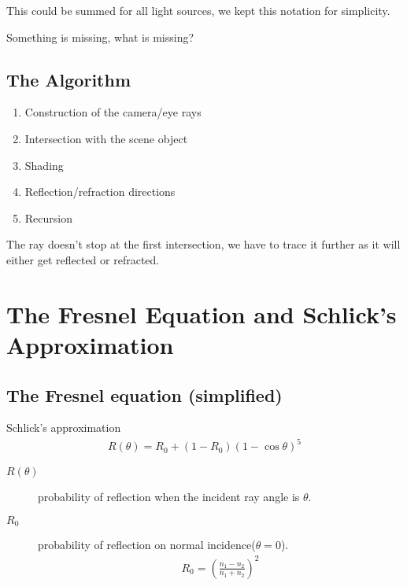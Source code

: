 \documentclass[../pbr.tex]{subfile}
\begin{document}
This could be summed for all light sources, we kept this notation for
simplicity.

Something is missing, what is missing?

\subsection{The Algorithm}%
\label{sub:the_algorithm}

\begin{enumerate}
  \item Construction of the camera/eye rays
  \item Intersection with the scene object
  \item Shading
  \item Reflection/refraction directions
  \item Recursion
\end{enumerate}

The ray doesn't stop at the first intersection, we have to trace it further
as it will either get reflected or refracted.

\section{The Fresnel Equation and Schlick's Approximation}%
\label{sec:the_fresnel_equation_and_schlick_s_approximation}

\begin{Figure}
  \begin{center}
    
  \end{center}
  \label{fig:05_1}
\end{Figure}

\subsection{The Fresnel equation (simplified)}%
\label{sub:the_fresnel_equation_simplified_}

Schlick's approximation
\begin{align*}
  R(\theta)=R_0+\left(1-R_0\right){\left(1-\cos\theta\right)}^5
\end{align*}
\begin{description}
  \item[$R(\theta)$] probability of reflection when the incident ray angle is
    $\theta$.
  \item[$R_0$] probability of reflection on normal incidence($\theta=0$).
    \begin{align*}
      R_0={\left(\frac{n_1-n_2}{n_1+n_2}\right)}^2
    \end{align*}
\end{description}
\end{document}
